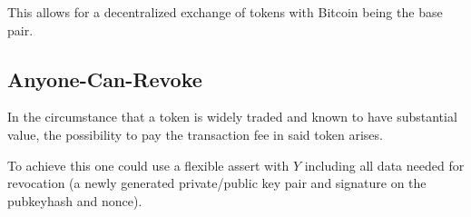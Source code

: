 \documentclass[9pt,oneside]{amsart}
\begin{document}
\begin{multicols}{2}
This allows for a decentralized exchange of tokens with Bitcoin being the base pair.

\subsection{Anyone-Can-Revoke}
In the circumstance that a token is widely traded and known to have substantial value, the possibility to pay the transaction fee in said token arises.

To achieve this one could use a flexible assert with $Y$ including all data needed for revocation (a newly generated private/public key pair and signature on the pubkeyhash and nonce).

\end{multicols}
\end{document}
